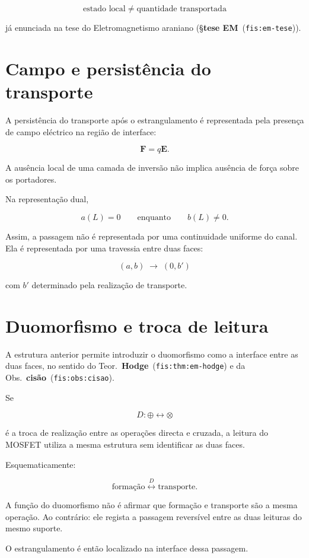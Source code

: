 \documentclass[11pt,a4paper]{article}
\newcommand{\code}[1]{\texttt{\small #1}}
\newcommand{\fis}[2]{\textbf{#2}~\textnormal{(\code{#1})}}
\begin{document}
\[
\boxed{\;\text{estado local}\;\neq\;\text{quantidade transportada}\;}
\]

já enunciada na tese do Eletromagnetismo araniano
(\S\fis{fis:em-tese}{tese EM}).


\section{Campo e persistência do transporte}

A persistência do transporte após o estrangulamento é representada
pela presença de campo eléctrico na região de interface:

\[
\mathbf F=q\mathbf E.
\]

A ausência local de uma camada de inversão não implica ausência
de força sobre os portadores.

Na representação dual,

\[
a(L)=0
\qquad\text{enquanto}\qquad
b(L)\neq0.
\]

Assim, a passagem não é representada por uma continuidade uniforme
do canal. Ela é representada por uma travessia entre duas faces:

\[
\boxed{
(a,b)
\;\longrightarrow\;
(0,b')
}
\]

com \(b'\) determinado pela realização de transporte.


\section{Duomorfismo e troca de leitura}
\label{sec:duomorf}

A estrutura anterior permite introduzir o duomorfismo como a
interface entre as duas faces, no sentido do Teor.~\fis{fis:thm:em-hodge}{Hodge}
e da Obs.~\fis{fis:obs:cisao}{cisão}.

Se

\[
D:\oplus\longleftrightarrow\otimes
\]

é a troca de realização entre as operações directa e cruzada,
a leitura do MOSFET utiliza a mesma estrutura sem identificar
as duas faces.

Esquematicamente:

\[
\boxed{
\text{formação}
\overset{D}{\longleftrightarrow}
\text{transporte}.
}
\]

A função do duomorfismo não é afirmar que formação e transporte
são a mesma operação. Ao contrário: ele regista a passagem
reversível entre as duas leituras do mesmo suporte.

O estrangulamento é então localizado na interface dessa passagem.
\end{document}
